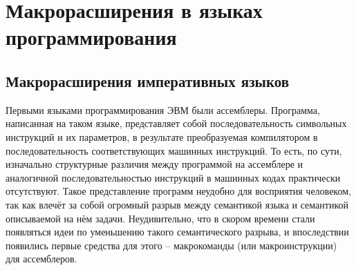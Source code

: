 %
%

\newpage
\section{Макрорасширения в языках программирования}

\subsection{Макрорасширения императивных языков}

Первыми языками программирования ЭВМ были ассемблеры. Программа, написанная на таком языке, представляет собой последовательность символьных инструкций и их параметров, в результате преобразуемая компилятором в последовательность соответствующих машинных инструкций. То есть, по сути, изначально структурные различия между программой на ассемблере и аналогичной последовательностью инструкций в машинных кодах практически отсутствуют. Такое представление программ неудобно для восприятия человеком, так как влечёт за собой огромный разрыв между семантикой языка и семантикой описываемой на нём задачи. Неудивительно, что в скором времени стали появляться идеи по уменьшению такого семантического разрыва, и впоследствии появились первые средства для этого -- макрокоманды (или макроинструкции) для ассемблеров.

